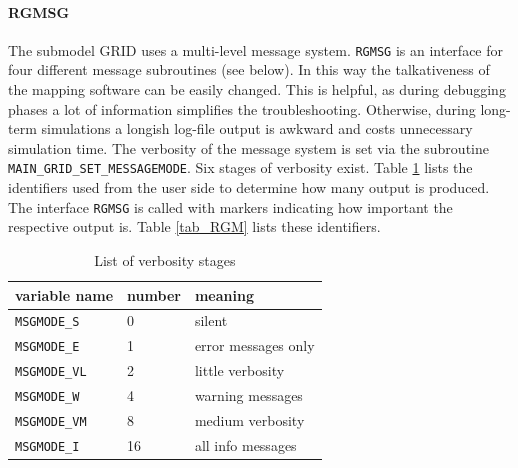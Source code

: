 \documentclass[11pt,twoside]{article}
\begin{document}
\paragraph{RGMSG\\ \label{RGMSG}}
The submodel GRID uses a multi-level message system.
\verb|RGMSG| is an interface for four different message subroutines
(see below).  
In this way the talkativeness of the mapping software can be easily
changed. This is helpful, as during debugging phases a lot of information
simplifies the troubleshooting. Otherwise, during long-term simulations a
longish log-file output is awkward and costs unnecessary simulation time.
The verbosity of the message system is set via the subroutine
\verb|MAIN_GRID_SET_MESSAGEMODE|.
Six stages of verbosity exist. Table \ref{tab_messages} lists
the identifiers used from the user side to determine how
many output is produced.
The interface \verb|RGMSG| is called with 
markers indicating how important the respective output is. Table \ref{tab_RGM}
lists these identifiers.

\begin{table}
\begin{center}
\begin{tabular}{|llp{8cm}|}\hline
variable name & number & meaning \\ \hline
\verb|MSGMODE_S| & 0 & silent\\
\verb|MSGMODE_E| & 1 & error messages only\\
\verb|MSGMODE_VL| & 2& little verbosity   \\
\verb|MSGMODE_W| & 4& warning messages\\
\verb|MSGMODE_VM| & 8& medium verbosity \\
\verb|MSGMODE_I| & 16 & all info messages\\ \hline
\end{tabular}
\caption{List of verbosity stages \label{tab_messages}}
\end{center}
\end{table}
\end{document}
